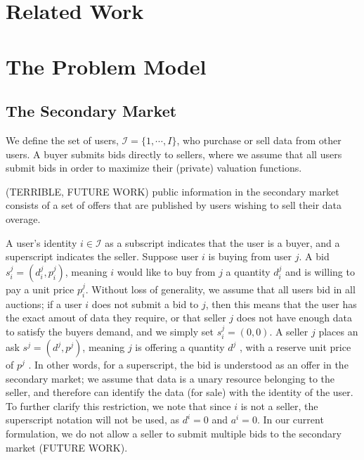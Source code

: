 \documentclass[12pt]{article}
\theoremstyle{definition}
\newcommand{\mcI}{\mathcal{I}}
\begin{document}
\begin{multicols}{2}
\section{Related Work}

\section{The Problem Model}
\subsection{The Secondary Market}

We define the set of users, $\mcI = \lbrace 1, \cdots, I\rbrace$, who purchase or sell
data from other users. A buyer submits bids directly to sellers, where we
assume that all users submit bids in order to maximize their
(private) valuation functions. 

(TERRIBLE, FUTURE WORK) public information in the
secondary market consists of a set of offers that are published by users
wishing to sell their data overage. 

A user's identity $i \in \mcI$ as a subscript indicates that the user
is a buyer, and a superscript indicates the seller.
Suppose user $i$ is buying from user $j$. A bid $s_i^j = (d_i^j, p_i^j)$,
meaning $i$ would like to buy from $j$ a quantity $d^j_i$ and is willing to pay
a unit price $p^j_i$. Without loss of generality, we assume that all users bid in all
auctions; if a user $i$ does not submit a bid to $j$, then this means that
the user has the exact amout of data they require, or that seller $j$ does not have
enough data to satisfy the buyers demand, and we simply set $s_i^j = (0, 0)$.
A seller $j$ places an ask $s^j = (d^j, p^j)$, meaning $j$ is offering a
quantity $d^j$ , with a reserve unit price of $p^j$ . In other words, for a
superscript, the bid is understood as an offer in the secondary
market; we assume that data is a unary resource belonging to the seller, and
therefore can identify the data (for sale) with the identity of the user.
To further clarify this restriction, we note that since $i$ is not a seller,
the superscript notation will not be used, as $d^i = 0$ and
$a^i = 0$. In our current formulation, we do not allow a seller to submit
multiple bids to the secondary market (FUTURE WORK).



\end{multicols}
\end{document}
